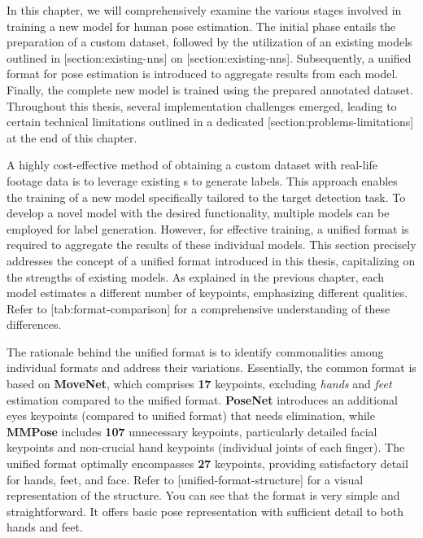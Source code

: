 In this chapter, we will comprehensively examine the various stages involved in training a new model for human pose estimation. The initial phase entails the preparation of a custom dataset, followed by the utilization of an existing models outlined in [section:existing-nns] on [section:existing-nns]. Subsequently, a unified format for pose estimation is introduced to aggregate results from each model. Finally, the complete new model is trained using the prepared annotated dataset. Throughout this thesis, several implementation challenges emerged, leading to certain technical limitations outlined in a dedicated [section:problems-limitations] at the end of this chapter.


A highly cost-effective method of obtaining a custom dataset with real-life footage data is to leverage existing \NN\-s to generate labels. This approach enables the training of a new model specifically tailored to the target detection task. To develop a novel model with the desired functionality, multiple models can be employed for label generation. However, for effective training, a unified format is required to aggregate the results of these individual models. This section precisely addresses the concept of a unified format introduced in this thesis, capitalizing on the strengths of existing models. As explained in the previous chapter, each model estimates a different number of keypoints, emphasizing different qualities. Refer to [tab:format-comparison] for a comprehensive understanding of these differences.

The rationale behind the unified format is to identify commonalities among individual formats and address their variations. Essentially, the common format is based on {\bf MoveNet}, which comprises {\bf 17} keypoints, excluding {\em hands} and {\em feet} estimation compared to the unified format. {\bf PoseNet} introduces an additional eyes keypoints (compared to unified format) that needs elimination, while {\bf MMPose} includes {\bf 107} unnecessary keypoints, particularly detailed facial keypoints and non-crucial hand keypoints (individual joints of each finger). The unified format optimally encompasses {\bf 27} keypoints, providing satisfactory detail for hands, feet, and face. Refer to [unified-format-structure] for a visual representation of the structure. You can see that the format is very simple and straightforward. It offers basic pose representation with sufficient detail to both hands and feet.

